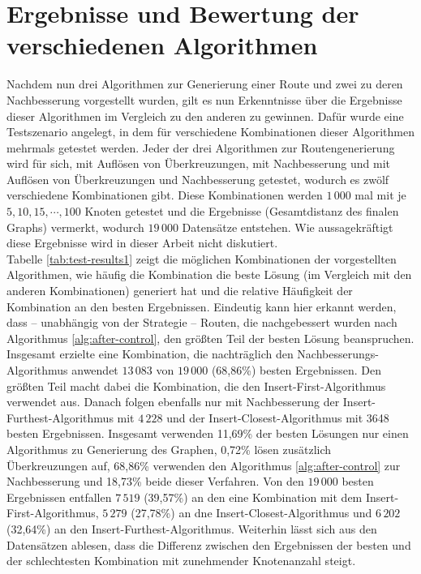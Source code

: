 \section{Ergebnisse und Bewertung der verschiedenen Algorithmen}
Nachdem nun drei Algorithmen zur Generierung einer Route und zwei zu deren Nachbesserung vorgestellt wurden, gilt es nun Erkenntnisse über die Ergebnisse dieser Algorithmen im Vergleich zu den anderen zu gewinnen.
Dafür wurde eine Testszenario angelegt, in dem für verschiedene Kombinationen dieser Algorithmen mehrmals getestet werden.
Jeder der drei Algorithmen zur Routengenerierung wird für sich, mit Auflösen von Überkreuzungen, mit Nachbesserung und mit Auflösen von Überkreuzungen und Nachbesserung getestet, wodurch es zwölf verschiedene Kombinationen gibt.
Diese Kombinationen werden $1\,000$ mal mit je $5,10,15,\cdots,100$ Knoten getestet und die Ergebnisse (Gesamtdistanz des finalen Graphs) vermerkt, wodurch $19\,000$ Datensätze entstehen. Wie aussagekräftigt diese Ergebnisse wird in dieser Arbeit nicht diskutiert.
\\
Tabelle \vref{tab:test-results1} zeigt die möglichen Kombinationen der vorgestellten Algorithmen, wie häufig die Kombination die beste Lösung (im Vergleich mit den anderen Kombinationen) generiert hat und die relative Häufigkeit der Kombination an den besten Ergebnissen.
Eindeutig kann hier erkannt werden, dass -- unabhängig von der Strategie -- Routen, die nachgebessert wurden nach Algorithmus \vref{alg:after-control}, den größten Teil der besten Lösung beanspruchen.
Insgesamt erzielte eine Kombination, die nachträglich den Nachbesserungs-Algorithmus anwendet $13\,083$ von $19\,000$ (68,86\%) besten Ergebnissen.
Den größten Teil macht dabei die Kombination, die den Insert-First-Algorithmus verwendet aus.
Danach folgen ebenfalls nur mit Nachbesserung der Insert-Furthest-Algorithmus mit $4\,228$ und der Insert-Closest-Algorithmus mit 3648 besten Ergebnissen.
Insgesamt verwenden 11,69\% der besten Lösungen nur einen Algorithmus zu Generierung des Graphen, 0,72\% lösen zusätzlich Überkreuzungen auf, 68,86\% verwenden den Algorithmus \vref{alg:after-control} zur Nachbesserung und 18,73\% beide dieser Verfahren.
Von den $19\,000$ besten Ergebnissen entfallen $7\,519$ (39,57\%) an den eine Kombination mit dem Insert-First-Algorithmus, $5\,279$ (27,78\%) an dne Insert-Closest-Algorithmus und $6\,202$ (32,64\%) an den Insert-Furthest-Algorithmus.
Weiterhin lässt sich aus den Datensätzen ablesen, dass die Differenz zwischen den Ergebnissen der besten und der schlechtesten Kombination mit zunehmender Knotenanzahl steigt.
